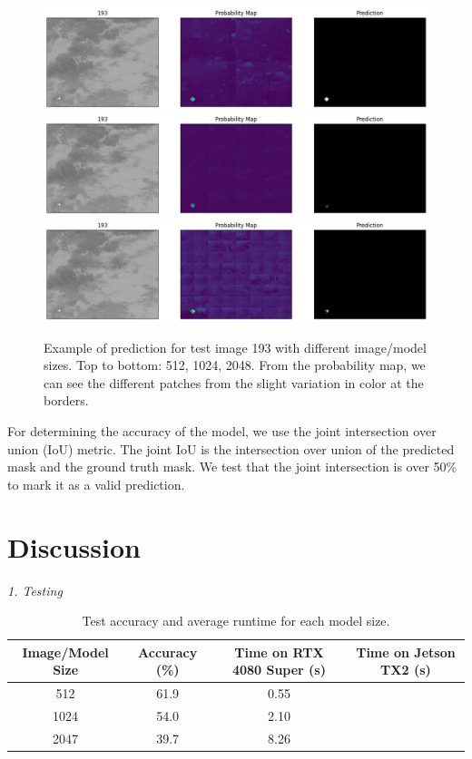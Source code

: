 \documentclass{article}
\begin{document}
\begin{figure}[H]
    \centering
    \includegraphics[width=1\textwidth]{figs/pred_512.png}\\
    \includegraphics[width=1\textwidth]{figs/pred_1024.png}\\
    \includegraphics[width=1\textwidth]{figs/pred_2048.png}
    \captionsetup{width=.8\linewidth} 
    \caption{Example of prediction for test image 193 with different image/model sizes. Top to bottom: 512, 1024, 2048. From the probability map, we can see the different patches from the slight variation in color at the borders.}
\end{figure}

For determining the accuracy of the model, we use the joint intersection over union (IoU) metric. The joint IoU is the intersection over union of the predicted mask and the ground truth mask. We test that the joint intersection is over 50\% to mark it as a valid prediction. 

\medskip

\section*{Discussion}
\textit{1. Testing} \\

\begin{table}[H]
    \centering
    \begin{tabular}{ | c | c | c | c | }
        \hline
        Image/Model Size & Accuracy (\%) & Time on RTX 4080 Super (s) & Time on Jetson TX2 (s) \\ 
        \hline
        512 & 61.9 & 0.55 & \\
        1024 & 54.0 & 2.10 & \\
        2047 & 39.7 & 8.26 & \\
        \hline
    \end{tabular}
    \captionsetup{width=.8\linewidth} 
    \caption{Test accuracy and average runtime for each model size.}
\end{table}
\end{document}
